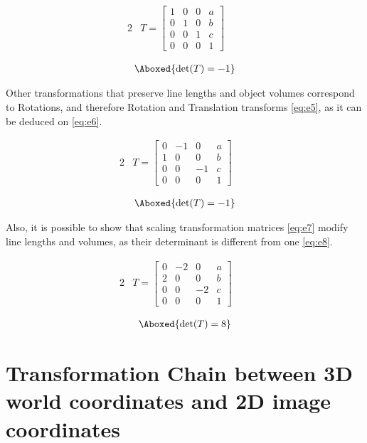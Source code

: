 \documentclass{article}
\begin{document}
\begin{alignat}{2}
&T = \begin{bmatrix}
1 & 0 & 0 & a \\
0 & 1 & 0 & b \\
0 & 0 & 1 & c \\
0 & 0 & 0 & 1
\end{bmatrix} & \quad   \label{eq:e3}
\end{alignat}

\begin{alignat}{2}
\Aboxed{\det(T) = -1} \label{eq:e4}
\end{alignat}

Other transformations that preserve line lengths and object volumes correspond to Rotations, and therefore Rotation and Translation transforms \eqref{eq:e5}, as it can be deduced on \eqref{eq:e6}.

\begin{alignat}{2}
&T = \begin{bmatrix}
0 & -1 & 0 & a \\
1 & 0 & 0 & b \\
0 & 0 & -1 & c \\
0 & 0 & 0 & 1
\end{bmatrix} & \quad   \label{eq:e5}
\end{alignat}

\begin{alignat}{2}
\Aboxed{\det(T) = -1} \label{eq:e6}
\end{alignat}

Also, it is possible to show that scaling transformation matrices \eqref{eq:e7} modify line lengths and volumes, as their determinant is different from one \eqref{eq:e8}.

\begin{alignat}{2}
&T = \begin{bmatrix}
0 & -2 & 0 & a \\
2 & 0 & 0 & b \\
0 & 0 & -2 & c \\
0 & 0 & 0 & 1
\end{bmatrix} & \quad   \label{eq:e7}
\end{alignat}

\begin{alignat}{2}
\Aboxed{\det(T) = 8} \label{eq:e8}
\end{alignat}

\section{Transformation Chain between 3D world coordinates and 2D image coordinates}
\end{document}
